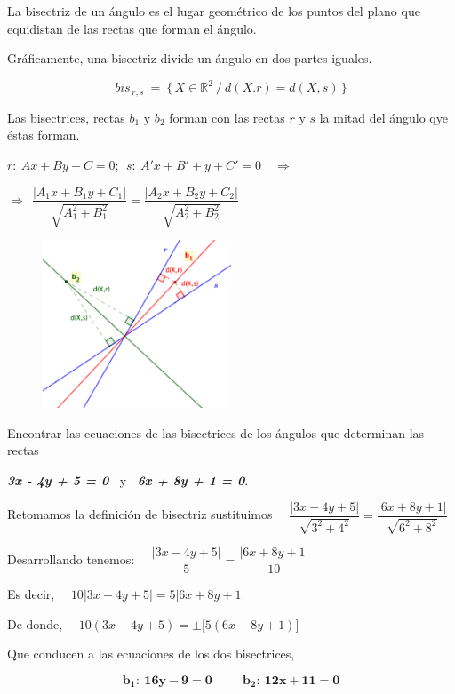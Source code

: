 \begin{definition}[ Bisectriz]

La bisectriz de un ángulo es el lugar geométrico de los puntos del plano que equidistan de las rectas que forman el ángulo. 
	
\end{definition}

\begin{multicols}{2}
Gráficamente, una bisectriz divide un ángulo en dos partes iguales.  

$$bis_{\, r,s}\ = \ \{ \, X\in \mathbb R^2 \ \big/ \ d(X.r)=d(X,s) \, \}$$

Las bisectrices, rectas $b_1$ y $b_2$ forman con las rectas $r$ y $s$ la mitad del ángulo qye éstas forman.

$r:\ Ax+By+C=0;\ \ s:\ A'x+B'+y+C'=0 \quad \Rightarrow $

$\Rightarrow \ \  \dfrac{|A_1x+B_1y+C_1|}{\sqrt{A_1^2+B_1^2}}=\dfrac{|A_2x+B_2y+C_2|}{\sqrt{A_2^2+B_2^2}}$

\begin{figure}[H]
	\centering
	\includegraphics[width=0.5\textwidth]{img-lg/lg02.png}
\end{figure}
\end{multicols}


\begin{miejemplo}

Encontrar las ecuaciones de las bisectrices de los ángulos que determinan las rectas 

\textbf{\textit{3x - 4y + 5 = 0}}  $\ $ y  $\ $  \textbf{\textit{6x + 8y + 1 = 0}}.

\vspace{5mm}

Retomamos la definición de bisectriz  sustituimos
$\quad  \dfrac{|3x-4y+5|}{\sqrt{3^2+4^2}}=\dfrac{|6x+8y+1|}{\sqrt{6^2+8^2}}$
     
\vspace{2mm} Desarrollando tenemos:
$ \quad \dfrac{|3x-4y+5|}{5}=\dfrac{|6x+8y+1|}{10}$

\vspace{2mm} Es decir,
$\quad 10|3x-4y+5|=5|6x+8y+1|$
    
\vspace{2mm} De donde, $\quad 10(3x-4y+5)= \pm \big[ 5(6x+8y+1) \big]$ 

\vspace{2mm} Que conducen a las ecuaciones de los dos bisectrices,

$$\boldsymbol{ b_1:\ 16y-9=0 \ \qquad \ b_2:\ 12x+11=0}$$
\end{miejemplo}

